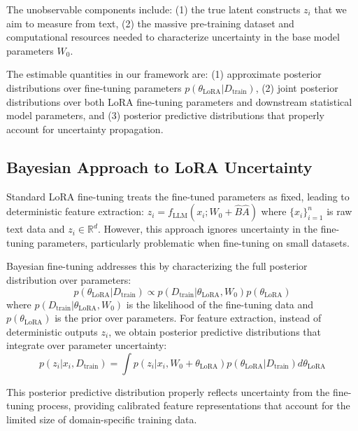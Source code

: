\documentclass[11pt]{article}
\begin{document}
The unobservable components include: 
(1) the true latent constructs $z_i$ that we aim to measure from text, 
(2) the massive pre-training dataset and computational resources needed to characterize uncertainty in the base model parameters $W_0$.

The estimable quantities in our framework are: 
(1) approximate posterior distributions over fine-tuning parameters $p(\theta_{\text{LoRA}}|D_{\text{train}})$, 
(2) joint posterior distributions over both LoRA fine-tuning parameters and downstream statistical model parameters, and
(3) posterior predictive distributions that properly account for uncertainty propagation.

\subsection{Bayesian Approach to LoRA Uncertainty}

Standard LoRA fine-tuning treats the fine-tuned parameters as fixed, leading to deterministic feature extraction:
$z_i = f_{\text{LLM}}(x_i; W_0 + \hat{B}\hat{A})$ where $\{x_i\}_{i=1}^n$ is raw text data and $z_i \in \mathbb{R}^d$. However, this approach ignores uncertainty in the fine-tuning parameters, particularly problematic when fine-tuning on small datasets. 

Bayesian fine-tuning \citep{yang2023bayesian, wang2024blob} addresses this by characterizing the full posterior distribution over parameters:
\begin{equation}
p(\theta_{\text{LoRA}}|D_{\text{train}}) \propto p(D_{\text{train}}|\theta_{\text{LoRA}}, W_0)p(\theta_{\text{LoRA}})
\end{equation}
where $p(D_{\text{train}}|\theta_{\text{LoRA}}, W_0)$ is the likelihood of the fine-tuning data and $p(\theta_{\text{LoRA}})$ is the prior over parameters. For feature extraction, instead of deterministic outputs $z_i$, we obtain posterior predictive distributions that integrate over parameter uncertainty:
\begin{equation}
p(z_i|x_i, D_{\text{train}}) = \int p(z_i|x_i, W_0 + \theta_{\text{LoRA}})p(\theta_{\text{LoRA}}|D_{\text{train}})d\theta_{\text{LoRA}}
\end{equation}

This posterior predictive distribution properly reflects uncertainty from the fine-tuning process, providing calibrated feature representations that account for the limited size of domain-specific training data.
\end{document}
